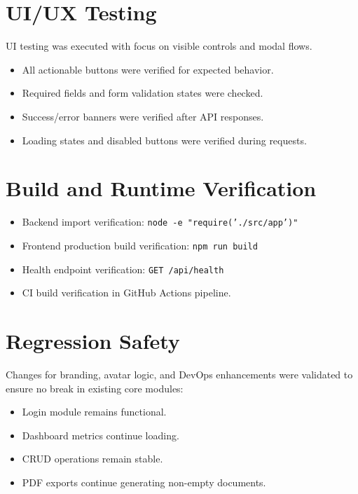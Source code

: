 \section{UI/UX Testing}
UI testing was executed with focus on visible controls and modal flows.
\begin{itemize}[leftmargin=1.3cm]
\item All actionable buttons were verified for expected behavior.
\item Required fields and form validation states were checked.
\item Success/error banners were verified after API responses.
\item Loading states and disabled buttons were verified during requests.
\end{itemize}

\section{Build and Runtime Verification}
\begin{itemize}[leftmargin=1.3cm]
\item Backend import verification: \texttt{node -e "require('./src/app')"}
\item Frontend production build verification: \texttt{npm run build}
\item Health endpoint verification: \texttt{GET /api/health}
\item CI build verification in GitHub Actions pipeline.
\end{itemize}

\section{Regression Safety}
Changes for branding, avatar logic, and DevOps enhancements were validated to ensure no break in existing core modules:
\begin{itemize}[leftmargin=1.3cm]
\item Login module remains functional.
\item Dashboard metrics continue loading.
\item CRUD operations remain stable.
\item PDF exports continue generating non-empty documents.
\end{itemize}
